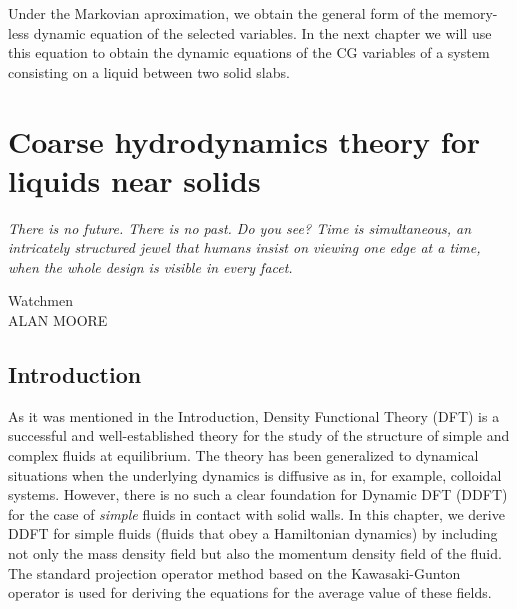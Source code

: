 \documentclass[b5paper,openright,11pt]{book}
\begin{document}
Under the Markovian aproximation, we obtain the general form of the memory-less dynamic equation of the selected variables. In the next chapter we will use this equation to obtain the dynamic equations of the CG variables of a system consisting on a liquid between two solid slabs.  



\chapter{Coarse hydrodynamics theory for liquids near solids}\label{Chap:Theory}
\epigraph{\textit{There is no future. There is no past. Do you see? Time is simultaneous, an intricately structured jewel that humans insist on viewing one edge at a time, when the whole design is visible in every facet.}}{Watchmen \\ ALAN MOORE} 


\section{Introduction}
As it was mentioned in the Introduction, Density Functional Theory (DFT) is a successful and well-established theory for the study of the structure of simple and complex fluids at equilibrium. The theory has been generalized to dynamical situations when the underlying dynamics is diffusive as in, for example, colloidal systems. However, there is no such a clear foundation for Dynamic DFT (DDFT) for the case of \textit{simple} fluids in contact with solid walls. 
In this chapter, we derive DDFT for simple fluids (fluids that obey  a Hamiltonian dynamics) by including not only the mass density field but also the momentum density field of the fluid. The standard projection operator method based on the Kawasaki-Gunton operator is used for deriving the equations for the average value of these fields. 
\end{document}
